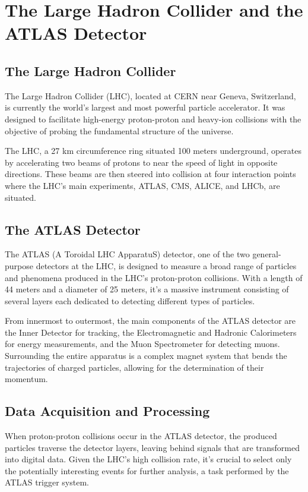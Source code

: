 \chapter{The Large Hadron Collider and the ATLAS Detector}

\section{The Large Hadron Collider}

The Large Hadron Collider (LHC), located at CERN near Geneva, Switzerland, is currently the world's largest and most
powerful particle accelerator. It was designed to facilitate high-energy proton-proton and heavy-ion collisions with the
objective of probing the fundamental structure of the universe.

The LHC, a 27 km circumference ring situated 100 meters underground, operates by accelerating two beams of protons to
near the speed of light in opposite directions. These beams are then steered into collision at four interaction points
where the LHC's main experiments, ATLAS, CMS, ALICE, and LHCb, are situated.

\section{The ATLAS Detector}

The ATLAS (A Toroidal LHC ApparatuS) detector, one of the two general-purpose detectors at the LHC, is designed to
measure a broad range of particles and phenomena produced in the LHC's proton-proton collisions. With a length of 44
meters and a diameter of 25 meters, it's a massive instrument consisting of several layers each dedicated to detecting
different types of particles.

From innermost to outermost, the main components of the ATLAS detector are the Inner Detector for tracking, the
Electromagnetic and Hadronic Calorimeters for energy measurements, and the Muon Spectrometer for detecting muons.
Surrounding the entire apparatus is a complex magnet system that bends the trajectories of charged particles, allowing
for the determination of their momentum.

\section{Data Acquisition and Processing}

When proton-proton collisions occur in the ATLAS detector, the produced particles traverse the detector layers, leaving
behind signals that are transformed into digital data. Given the LHC's high collision rate, it's crucial to select only
the potentially interesting events for further analysis, a task performed by the ATLAS trigger system.

